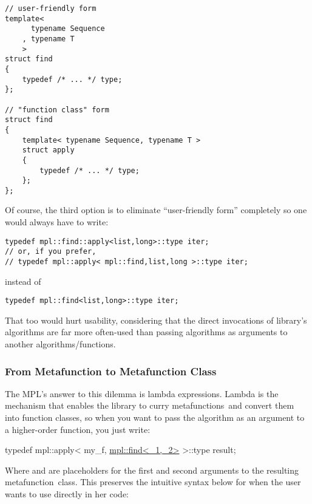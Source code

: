 \documentclass{kapproc}
\newcommand{\mfn}{meta\-func\-tion}
\newcommand{\mfns}{meta\-func\-tions}
\begin{document}
{\small
\begin{codesamp}\begin{verbatim}
// user-friendly form
template<
      typename Sequence
    , typename T
    >
struct find
{
    typedef /* ... */ type;
};

// "function class" form
struct find
{
    template< typename Sequence, typename T >
    struct apply
    {
        typedef /* ... */ type;
    };
};
\end{verbatim}
\end{codesamp}
}

Of course, the third option is to eliminate ``user-friendly form''
completely so one would always have to write:

{\small
\begin{codesamp}\begin{verbatim}
typedef mpl::find::apply<list,long>::type iter;
// or, if you prefer,
// typedef mpl::apply< mpl::find,list,long >::type iter;
\end{verbatim}
\end{codesamp}
}

instead of 

{\small
\begin{codesamp}\begin{verbatim}
typedef mpl::find<list,long>::type iter;
\end{verbatim}
\end{codesamp}
}

That too would hurt usability, considering that the direct 
invocations of library's algorithms are far more often-used than 
passing algorithms as arguments to another algorithms/functions. 

\subsubsection{From Metafunction to Metafunction Class}

The MPL's answer to this dilemma is lambda expressions.  Lambda is the
mechanism that enables the library to curry \mfns\ and convert them
into function classes, so when you want to pass the 
algorithm as an argument to a higher-order function, you just write:

{\small
\begin{codesamp}
typedef mpl::apply< my\_f, \underline{mpl::find<\_1,\_2>} >::type result;
\end{codesamp}
}

Where  and  are placeholders for the first and
second arguments to the resulting \mfn\ class. This preserves the
intuitive syntax below for when the user wants to use 
directly in her code:
\end{document}
